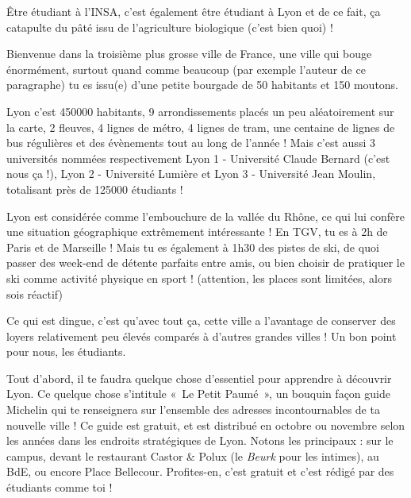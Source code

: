 Être étudiant à l'INSA, c'est également être étudiant à Lyon et de ce fait, ça
catapulte du pâté issu de l'agriculture biologique (c'est bien quoi) !

\vspace{1em}

Bienvenue dans la troisième plus grosse ville de France, une ville
qui bouge énormément, surtout quand comme beaucoup (par exemple l'auteur de ce
paragraphe) tu es issu(e) d'une petite bourgade de 50 habitants et 150 moutons.

\vspace{1em}

Lyon c'est 450000 habitants, 9 arrondissements placés un peu aléatoirement sur
la carte, 2 fleuves, 4 lignes de métro, 4 lignes de tram, une centaine de lignes
de bus régulières et des évènements tout au long de l'année ! Mais c'est aussi 3
universités nommées respectivement Lyon 1 - Université Claude Bernard (c'est
nous ça !), Lyon 2 - Université Lumière et Lyon 3 - Université Jean
Moulin, totalisant près de 125000 étudiants !

\vspace{1em}

Lyon est considérée comme l'embouchure de la vallée du Rhône, ce qui lui confère
une situation géographique extrêmement intéressante ! En TGV, tu es
à 2h de Paris et de Marseille ! Mais tu es également à 1h30 des pistes de ski,
de quoi passer des week-end de détente parfaits entre amis, ou bien choisir de
pratiquer le ski comme activité physique en sport ! (attention, les places sont limitées, alors sois réactif)

\vspace{1em}

Ce qui est dingue, c'est qu'avec tout ça, cette ville a l'avantage de conserver
des loyers relativement peu élevés comparés à d'autres grandes villes ! Un bon point pour nous, les étudiants.

\vspace{1em}

Tout d'abord, il te faudra quelque chose d'essentiel pour apprendre à découvrir
Lyon. Ce quelque chose s'intitule «~Le Petit Paumé~», un bouquin façon guide
Michelin qui te renseignera sur l'ensemble des adresses incontournables de ta
nouvelle ville ! Ce guide est gratuit, et est distribué en octobre ou novembre
selon les années dans les endroits stratégiques de Lyon. Notons les
principaux : sur le campus, devant le restaurant Castor \& Polux (le \emph{Beurk} pour les
intimes), au BdE, ou encore Place Bellecour. Profites-en, c'est gratuit
et c'est rédigé par des étudiants comme toi !

